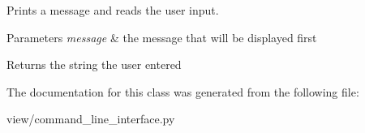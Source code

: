 Prints a message and reads the user input. 


\begin{DoxyParams}{Parameters}
{\em message} & the message that will be displayed first \\
\hline
\end{DoxyParams}
\begin{DoxyReturn}{Returns}
the string the user entered 
\end{DoxyReturn}


The documentation for this class was generated from the following file\+:\begin{DoxyCompactItemize}
\item 
view/command\+\_\+line\+\_\+interface.\+py\end{DoxyCompactItemize}

